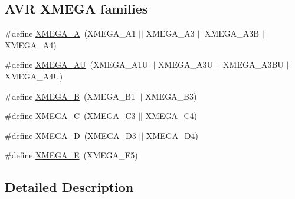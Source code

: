 \subsection*{A\-V\-R X\-M\-E\-G\-A families}
\begin{DoxyCompactItemize}
\item 
\#define \hyperlink{group__xmega__part__macros__group_gab903a90d3a0bc99d7248eaecbb325a23}{X\-M\-E\-G\-A\-\_\-\-A}~(X\-M\-E\-G\-A\-\_\-\-A1 $|$$|$ X\-M\-E\-G\-A\-\_\-\-A3 $|$$|$ X\-M\-E\-G\-A\-\_\-\-A3\-B $|$$|$ X\-M\-E\-G\-A\-\_\-\-A4)
\item 
\#define \hyperlink{group__xmega__part__macros__group_ga55210f3805902072fce76647b50fa177}{X\-M\-E\-G\-A\-\_\-\-A\-U}~(X\-M\-E\-G\-A\-\_\-\-A1\-U $|$$|$ X\-M\-E\-G\-A\-\_\-\-A3\-U $|$$|$ X\-M\-E\-G\-A\-\_\-\-A3\-B\-U $|$$|$ X\-M\-E\-G\-A\-\_\-\-A4\-U)
\item 
\#define \hyperlink{group__xmega__part__macros__group_ga62f2c1c93640237425cb64186ddce219}{X\-M\-E\-G\-A\-\_\-\-B}~(X\-M\-E\-G\-A\-\_\-\-B1 $|$$|$ X\-M\-E\-G\-A\-\_\-\-B3)
\item 
\#define \hyperlink{group__xmega__part__macros__group_ga75b06dd59d29b1de54dd73fe67830973}{X\-M\-E\-G\-A\-\_\-\-C}~(X\-M\-E\-G\-A\-\_\-\-C3 $|$$|$ X\-M\-E\-G\-A\-\_\-\-C4)
\item 
\#define \hyperlink{group__xmega__part__macros__group_gacc9e4b074c3f87ce7b461483b0beb15c}{X\-M\-E\-G\-A\-\_\-\-D}~(X\-M\-E\-G\-A\-\_\-\-D3 $|$$|$ X\-M\-E\-G\-A\-\_\-\-D4)
\item 
\#define \hyperlink{group__xmega__part__macros__group_gaab6d2543c5128fca0b1aeecb5c080723}{X\-M\-E\-G\-A\-\_\-\-E}~(X\-M\-E\-G\-A\-\_\-\-E5)
\end{DoxyCompactItemize}


\subsection{Detailed Description}


